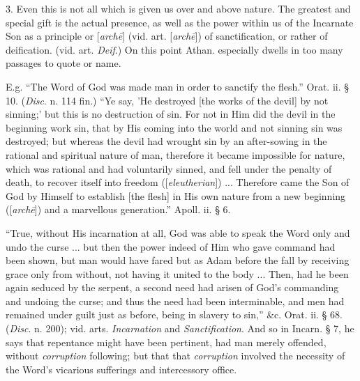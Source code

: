 3. Even this is not all which is given us over
and above nature. The greatest and special gift is the actual
presence, as well as the power within us of the Incarnate Son as a
principle or [\emph{arch\={e}}]
(vid. art. [\emph{arch\={e}}])
of sanctification, or rather of deification. (vid. art. \emph{Deif}.)
On this point Athan. especially dwells in too many passages to quote
or name.

E.g. ``The Word of God was made man in order to
sanctify the flesh.'' Orat. ii. § 10. (\emph{Disc}.
n. 114 fin.) ``Ye say, 'He destroyed [the works of the devil] by not
sinning;' but this is no destruction of sin. For not in Him did the
devil in the beginning work sin, that by His coming into the world and
not sinning sin was destroyed; but whereas the devil had wrought sin
by an after-sowing in the rational and spiritual nature of man,
therefore it became impossible for nature, which was rational and had
voluntarily sinned, and fell under the penalty of death, to recover
itself into freedom ([\emph{eleutherian}]) ... Therefore came the Son
of God by Himself to establish [the flesh] in His own nature from a
new beginning ([\emph{arch\={e}}]) and a marvellous generation.'' Apoll. ii. § 6.

``True,
without His incarnation at all, God was able to speak the Word only
and undo the curse ... but then the power indeed of Him who gave
command had been shown, but man would have fared but as Adam before
the fall by receiving grace only from without, not having it united to
the body ... Then, had he been again seduced by the serpent, a second
need had arisen of God's commanding and undoing the curse; and thus
the need had been interminable, and men had remained under guilt just
as before, being in slavery to sin,'' \&c. Orat. ii. § 68. (\emph{Disc}. n. 200); vid. arts. \emph{Incarnation}
and \emph{Sanctification}. And so in
Incarn. § 7, he says that repentance might have been pertinent, had
man merely offended, without \emph{corruption}
following; but that that \emph{corruption} involved the necessity of the Word's vicarious sufferings and
intercessory office.

